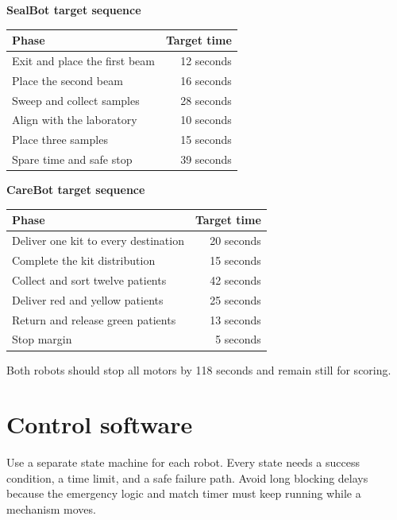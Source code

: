 \documentclass[11pt,a4paper]{article}
\begin{document}
\begin{center}
\begin{minipage}{0.78\textwidth}
\centering
\textbf{SealBot target sequence}\\[3pt]
\begin{tabularx}{\textwidth}{Xr}
\toprule
\textbf{Phase} & \textbf{Target time}\\
\midrule
Exit and place the first beam & 12 seconds\\
Place the second beam & 16 seconds\\
Sweep and collect samples & 28 seconds\\
Align with the laboratory & 10 seconds\\
Place three samples & 15 seconds\\
Spare time and safe stop & 39 seconds\\
\bottomrule
\end{tabularx}
\end{minipage}
\end{center}

\begin{center}
\begin{minipage}{0.78\textwidth}
\centering
\textbf{CareBot target sequence}\\[3pt]
\begin{tabularx}{\textwidth}{Xr}
\toprule
\textbf{Phase} & \textbf{Target time}\\
\midrule
Deliver one kit to every destination & 20 seconds\\
Complete the kit distribution & 15 seconds\\
Collect and sort twelve patients & 42 seconds\\
Deliver red and yellow patients & 25 seconds\\
Return and release green patients & 13 seconds\\
Stop margin & 5 seconds\\
\bottomrule
\end{tabularx}
\end{minipage}
\end{center}

Both robots should stop all motors by 118 seconds and remain still for scoring.

\section{Control software}

Use a separate state machine for each robot. Every state needs a success condition, a time limit, and a safe failure path. Avoid long blocking delays because the emergency logic and match timer must keep running while a mechanism moves.
\end{document}
